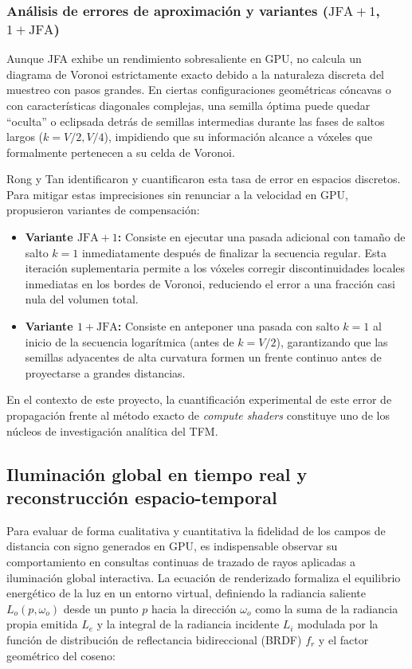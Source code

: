\subsubsection{Análisis de errores de aproximación y variantes \texorpdfstring{($\text{JFA}+1$, $1+\text{JFA}$)}{(JFA+1, 1+JFA)}}

Aunque JFA exhibe un rendimiento sobresaliente en GPU, no calcula un diagrama de Voronoi estrictamente exacto debido a la naturaleza discreta del muestreo con pasos grandes. En ciertas configuraciones geométricas cóncavas o con características diagonales complejas, una semilla óptima puede quedar ``oculta'' o eclipsada detrás de semillas intermedias durante las fases de saltos largos ($k = V/2, V/4$), impidiendo que su información alcance a vóxeles que formalmente pertenecen a su celda de Voronoi.

Rong y Tan \cite{rong2006} identificaron y cuantificaron esta tasa de error en espacios discretos. Para mitigar estas imprecisiones sin renunciar a la velocidad en GPU, propusieron variantes de compensación:

\begin{itemize}
  \item \textbf{Variante $\text{JFA}+1$:} Consiste en ejecutar una pasada adicional con tamaño de salto $k=1$ inmediatamente después de finalizar la secuencia regular. Esta iteración suplementaria permite a los vóxeles corregir discontinuidades locales inmediatas en los bordes de Voronoi, reduciendo el error a una fracción casi nula del volumen total.
  \item \textbf{Variante $1+\text{JFA}$:} Consiste en anteponer una pasada con salto $k=1$ al inicio de la secuencia logarítmica (antes de $k = V/2$), garantizando que las semillas adyacentes de alta curvatura formen un frente continuo antes de proyectarse a grandes distancias.
\end{itemize}

En el contexto de este proyecto, la cuantificación experimental de este error de propagación frente al método exacto de \textit{compute shaders} constituye uno de los núcleos de investigación analítica del TFM.

\subsection{Iluminación global en tiempo real y reconstrucción espacio-temporal}

Para evaluar de forma cualitativa y cuantitativa la fidelidad de los campos de distancia con signo generados en GPU, es indispensable observar su comportamiento en consultas continuas de trazado de rayos aplicadas a iluminación global interactiva. La ecuación de renderizado \cite{kajiya1986} formaliza el equilibrio energético de la luz en un entorno virtual, definiendo la radiancia saliente $L_o(p, \omega_o)$ desde un punto $p$ hacia la dirección $\omega_o$ como la suma de la radiancia propia emitida $L_e$ y la integral de la radiancia incidente $L_i$ modulada por la función de distribución de reflectancia bidireccional (BRDF) $f_r$ y el factor geométrico del coseno:

